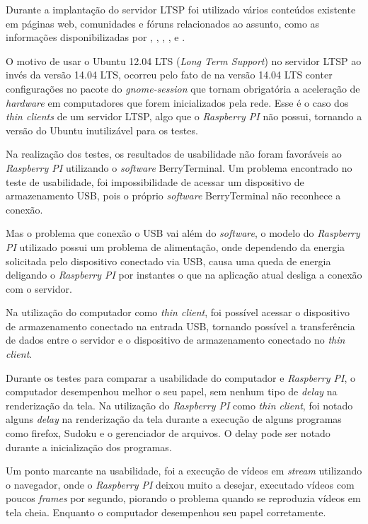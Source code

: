 \documentclass[
	12pt,				%
	openright,			%
	twoside,			%
	a4paper,			%
	chapter=TITLE,		%
	english,			%
	brazil				%
	]{abntex2}
\begin{document}
Durante a implantação do servidor LTSP foi utilizado vários conteúdos existente em páginas web, comunidades e fóruns relacionados ao assunto, como as informações disponibilizadas por , , , ,  e .

O motivo de usar o Ubuntu 12.04 LTS (\textit{Long Term Support}) no servidor LTSP ao invés da versão 14.04 LTS, ocorreu pelo fato de na versão 14.04 LTS conter configurações no pacote do \textit{gnome-session} que tornam obrigatória a aceleração de \textit{hardware} em computadores que forem inicializados pela rede. Esse é o caso dos \textit{thin clients} de um servidor LTSP, algo que o \textit{Raspberry PI} não possui, tornando a versão do Ubuntu inutilizável para os testes.

Na realização dos testes, os resultados de usabilidade não foram favoráveis ao \textit{Raspberry PI} utilizando o \textit{software} BerryTerminal. Um problema encontrado no teste de usabilidade, foi impossibilidade de acessar um dispositivo de armazenamento USB, pois o próprio \textit{software} BerryTerminal não reconhece a conexão.

Mas o problema que conexão o USB vai além do \textit{software}, o modelo do \textit{Raspberry PI} utilizado possui um problema de alimentação, onde dependendo da energia solicitada pelo dispositivo conectado via USB, causa uma queda de energia deligando o \textit{Raspberry PI} por instantes o que na aplicação atual desliga a conexão com o servidor.

Na utilização do computador como \textit{thin client}, foi possível acessar o dispositivo de armazenamento conectado na entrada USB, tornando possível  a transferência de dados entre o servidor e o dispositivo de armazenamento conectado no \textit{thin client}.

Durante os testes para comparar a usabilidade do computador e \textit{Raspberry PI}, o computador desempenhou melhor o seu papel, sem nenhum tipo de \textit{delay} na renderização da tela.  Na utilização do \textit{Raspberry PI} como \textit{thin client}, foi notado alguns \textit{delay} na renderização da tela durante a execução de alguns programas como firefox, Sudoku e o gerenciador de arquivos. O delay pode ser notado durante a inicialização dos programas.

Um ponto marcante na usabilidade, foi a execução de vídeos em \textit{stream} utilizando o navegador, onde o \textit{Raspberry PI} deixou muito a desejar, executado vídeos com poucos \textit{frames} por segundo, piorando o problema quando se reproduzia vídeos em tela cheia. Enquanto o computador desempenhou seu papel corretamente.
\end{document}
